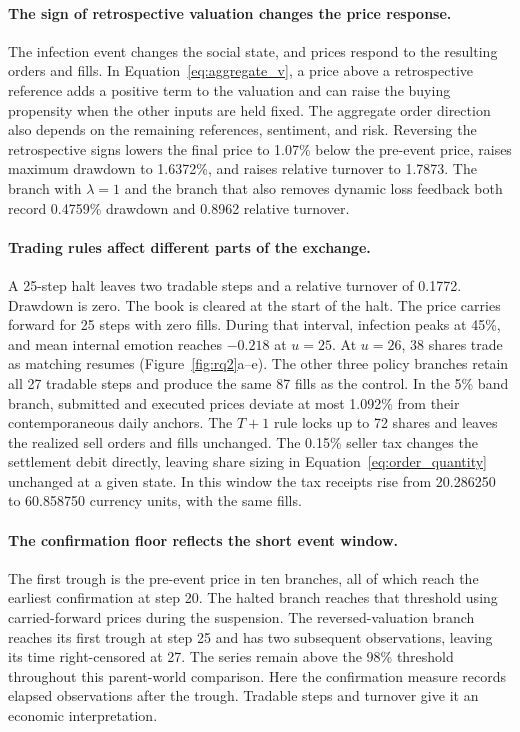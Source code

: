 \paragraph{The sign of retrospective valuation changes the price response.}
The infection event changes the social state, and prices respond to the resulting orders and fills. In Equation~\eqref{eq:aggregate_v}, a price above a retrospective reference adds a positive term to the valuation and can raise the buying propensity when the other inputs are held fixed. The aggregate order direction also depends on the remaining references, sentiment, and risk. Reversing the retrospective signs lowers the final price to 1.07\% below the pre-event price, raises maximum drawdown to 1.6372\%, and raises relative turnover to 1.7873. The branch with $\lambda=1$ and the branch that also removes dynamic loss feedback both record 0.4759\% drawdown and 0.8962 relative turnover.

\paragraph{Trading rules affect different parts of the exchange.}
A 25-step halt leaves two tradable steps and a relative turnover of 0.1772. Drawdown is zero. The book is cleared at the start of the halt. The price carries forward for 25 steps with zero fills. During that interval, infection peaks at 45\%, and mean internal emotion reaches $-0.218$ at $u=25$. At $u=26$, 38 shares trade as matching resumes (Figure~\ref{fig:rq2}a--e). The other three policy branches retain all 27 tradable steps and produce the same 87 fills as the control. In the 5\% band branch, submitted and executed prices deviate at most 1.092\% from their contemporaneous daily anchors. The $T+1$ rule locks up to 72 shares and leaves the realized sell orders and fills unchanged. The 0.15\% seller tax changes the settlement debit directly, leaving share sizing in Equation~\eqref{eq:order_quantity} unchanged at a given state. In this window the tax receipts rise from 20.286250 to 60.858750 currency units, with the same fills.

\paragraph{The confirmation floor reflects the short event window.}
The first trough is the pre-event price in ten branches, all of which reach the earliest confirmation at step 20. The halted branch reaches that threshold using carried-forward prices during the suspension. The reversed-valuation branch reaches its first trough at step 25 and has two subsequent observations, leaving its time right-censored at 27. The series remain above the 98\% threshold throughout this parent-world comparison. Here the confirmation measure records elapsed observations after the trough. Tradable steps and turnover give it an economic interpretation.

